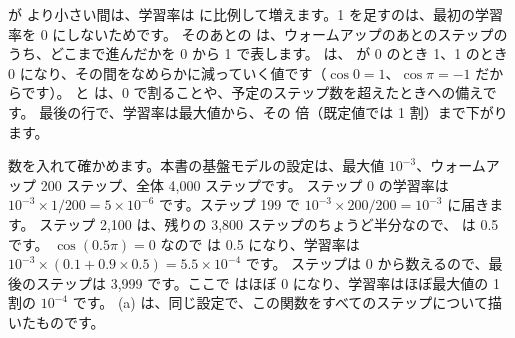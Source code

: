  が  より小さい間は、学習率は  に比例して増えます。1 を足すのは、最初の学習率を 0 にしないためです。
そのあとの  は、ウォームアップのあとのステップのうち、どこまで進んだかを 0 から 1 で表します。
 は、 が 0 のとき 1、1 のとき 0 になり、その間をなめらかに減っていく値です（$\cos 0=1$、$\cos\pi=-1$ だからです）。
 と  は、0 で割ることや、予定のステップ数を超えたときへの備えです。
最後の行で、学習率は最大値から、その  倍（既定値では 1 割）まで下がります。

数を入れて確かめます。本書の基盤モデルの設定は、最大値 $10^{-3}$、ウォームアップ 200 ステップ、全体 4,000 ステップです。
ステップ 0 の学習率は $10^{-3}\times1/200=5\times10^{-6}$ です。ステップ 199 で $10^{-3}\times200/200=10^{-3}$ に届きます。
ステップ 2,100 は、残りの 3,800 ステップのちょうど半分なので、 は 0.5 です。
$\cos(0.5\pi)=0$ なので  は 0.5 になり、学習率は $10^{-3}\times(0.1+0.9\times0.5)=5.5\times10^{-4}$ です。
ステップは 0 から数えるので、最後のステップは 3,999 です。ここで  はほぼ 0 になり、学習率はほぼ最大値の 1 割の $10^{-4}$ です。
(a) は、同じ設定で、この関数をすべてのステップについて描いたものです。

